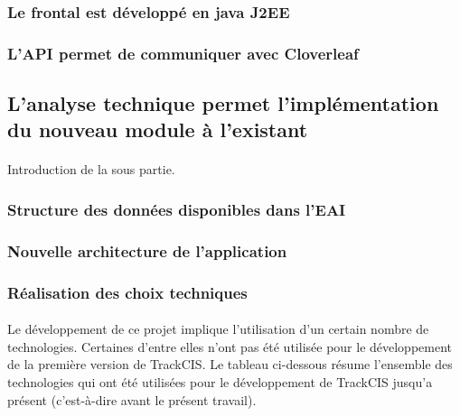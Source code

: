 			\paragraph{}%
		\subsubsection{Le frontal est développé en java J2EE}
			\paragraph{}%
			
			\paragraph{}%
		\subsubsection{L'API permet de communiquer avec Cloverleaf}
			\paragraph{}%
	
	\subsection{L'analyse technique permet l'implémentation du nouveau module à l'existant}
		\paragraph{}
		Introduction de la sous partie.
		
		\subsubsection{Structure des données disponibles dans l'EAI}
		\subsubsection{Nouvelle architecture de l'application}
			
		\subsubsection{Réalisation des choix techniques}
			\paragraph{}%
			Le développement de ce projet implique l'utilisation d'un certain nombre de
			technologies. Certaines d'entre elles n'ont pas été utilisée pour le
			développement de la première version de TrackCIS.
			Le tableau ci-dessous résume l'ensemble des technologies qui ont été
			utilisées pour le développement de TrackCIS jusqu'a présent (c'est-à-dire
			avant le présent travail).
			
